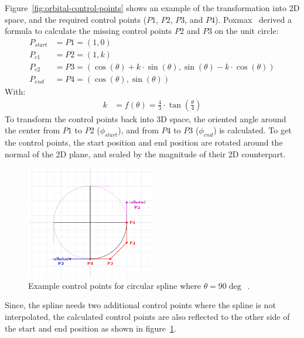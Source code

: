 Figure~\ref{fig:orbital-control-points} shows an example of the transformation into 2D space, and the required
control points ($P1$, $P2$, $P3$, and $P4$).
Poxmax~\cite{Poxmax2021} derived a formula to calculate the missing control points $P2$ and $P3$ on the unit circle:
\begin{equation}
    \label{eq:control-points}
    \begin{aligned}
        P_{start} &= P1 = (1, 0) \\
        P_{c1} &= P2 = (1, k) \\
        P_{c2} &= P3 = (\cos(\theta) + k \cdot \sin(\theta), \sin(\theta) - k \cdot \cos(\theta)) \\
        P_{end} &= P4 = (\cos(\theta), \sin(\theta))
    \end{aligned}
\end{equation}
With:
\begin{equation}
    \label{eq:control-points-factor}
    \begin{aligned}
        k &= f(\theta) = \frac{4}{3} \cdot \tan\left( \frac{\theta}{4} \right)
    \end{aligned}
\end{equation}
To transform the control points back into 3D space, the oriented angle around the center from $P1$ to $P2$
($\phi_{start}$), and from $P4$ to $P3$ ($\phi_{end}$) is calculated.
To get the control points, the start position and end position are rotated around the normal of the 2D plane, and
scaled by the magnitude of their 2D counterpart.

\begin{figure}[h]
    \centering
    \includegraphics[width=0.5\textwidth]{content/4_3_autoNavigation/img/ControlPointsReflected}
    \caption{Example control points for circular spline where $\theta = 90\deg$~\cite{Poxmax2021}.}
    \label{fig:orbital-reflected-points}
\end{figure}

Since, the spline needs two additional control points where the spline is not interpolated, the calculated control
points are also reflected to the other side of the start and end position as shown in
figure~\ref{fig:orbital-reflected-points}.

